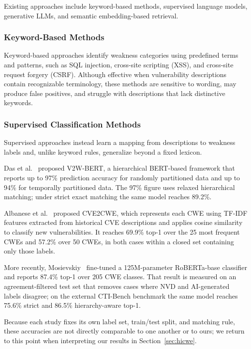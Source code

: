 \documentclass[conference,compsoc]{IEEEtran}
\begin{document}
Existing approaches include keyword-based
methods, supervised language models, generative
LLMs, and semantic
embedding-based retrieval.

\subsubsection{Keyword-Based Methods}

Keyword-based approaches identify weakness categories using predefined terms and patterns, such as SQL injection, cross-site scripting (XSS), and cross-site request forgery (CSRF). Although effective when vulnerability descriptions contain recognizable terminology, these methods are sensitive to wording, may produce false positives, and struggle with descriptions that lack distinctive keywords.

\subsubsection{Supervised Classification Methods}

Supervised approaches instead learn a mapping from descriptions to weakness labels and, unlike keyword rules, generalize beyond a fixed lexicon.

Das et al.~\cite{das2021v2w} proposed V2W-BERT, a hierarchical BERT-based framework that reports up to 97\% prediction accuracy for randomly partitioned data and up to 94\% for temporally partitioned data. The 97\% figure uses relaxed hierarchical matching; under strict exact matching the same model reaches 89.2\%.

Albanese et al.~\cite{albanese2024cve2cwe} proposed CVE2CWE, which represents each CWE using TF-IDF features extracted from historical CVE descriptions and applies cosine similarity to classify new vulnerabilities. It reaches 69.9\% top-1 over the 25 most frequent CWEs and 57.2\% over 50 CWEs, in both cases within a closed set containing only those labels.

More recently, Mosievskiy~\cite{mosievskiy2026roberta} fine-tuned a 125M-parameter RoBERTa-base classifier and reports 87.4\% top-1 over 205 CWE classes. That result is measured on an agreement-filtered test set that removes cases where NVD and AI-generated labels disagree; on the external CTI-Bench benchmark the same model reaches 75.6\% strict and 86.5\% hierarchy-aware top-1.

Because each study fixes its own label set, train/test split, and matching rule, these accuracies are not directly comparable to one another or to ours; we return to this point when interpreting our results in Section~\ref{sec:hicwe}.
\end{document}
